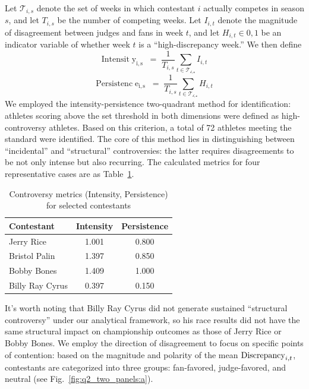 \documentclass[12pt]{article}
\begin{document}
Let $\mathcal{T}_{i,s}$ denote the set of weeks in which contestant $i$ actually competes in season $s$, and let $T_{i,s}$ be the number of competing weeks. Let $I_{i,t}$ denote the magnitude of disagreement between judges and fans in week $t$, and let $H_{i,t}\in0,1$ be an indicator variable of whether week $t$ is a ``high-discrepancy week.'' We then define
\begin{equation}
\mathrm{Intensit}\mathrm{\operatorname{y}}_{\mathrm{i,s}}\;=\;\frac{1}{T_{i,s}}\sum_{t\in\mathcal{T}_{\mathcal{i},\mathcal{s}}} I_{i,t}
\end{equation}
\begin{equation}
\mathrm{Persistenc}\mathrm{\operatorname{e}}_{\mathrm{i,s}}\;=\;\frac{1}{T_{i,s}}\sum_{t\in\mathcal{T}_{\mathcal{i},\mathcal{s}}} H_{i,t}
\end{equation}
We employed the intensity-persistence two-quadrant method for identification: athletes scoring above the set threshold in both dimensions were defined as high-controversy athletes. Based on this criterion, a total of 72 athletes meeting the standard were identified. The core of this method lies in distinguishing between “incidental” and “structural” controversies: the latter requires disagreements to be not only intense but also recurring. The calculated metrics for four representative cases are as Table~\ref{tab:typical controversy cases}. 

\begin{table}[htbp]
  \centering
  \caption{Controversy metrics (Intensity, Persistence) for selected contestants}
  \label{tab:typical controversy cases}
  \begin{tabular}{lcc}
    \toprule
    Contestant & Intensity & Persistence \\
    \midrule
    Jerry Rice & 1.001 & 0.800 \\
    Bristol Palin & 1.397 & 0.850 \\
    Bobby Bones & 1.409 & 1.000 \\
    Billy Ray Cyrus & 0.397 & 0.150 \\
    \bottomrule
  \end{tabular}
\end{table}

It's worth noting that Billy Ray Cyrus did not generate sustained “structural controversy” under our analytical framework, so his race results did not have the same structural impact on championship outcomes as those of Jerry Rice or Bobby Bones.
We employ the direction of disagreement to focus on specific points of contention: based on the magnitude and polarity of the mean ${\rm Discrepancy}_{i,t}$, contestants are categorized into three groups: fan-favored, judge-favored, and neutral (see Fig.~\ref{fig:q2_two_panels:a}).
\end{document}
